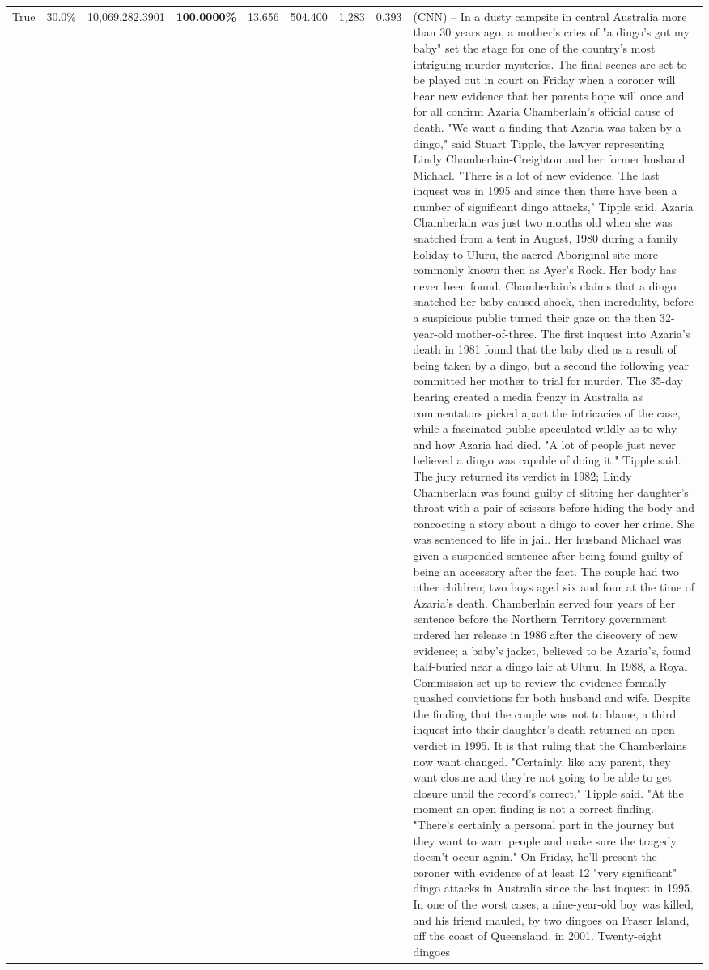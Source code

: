\begin{table}[H]
\begin{tabular}{lllrlllll}
True & 30.0\% & 10,069,282.3901 & \bfseries \color{red} 100.0000\% & 13.656 & 504.400 & 1,283 & 0.393 & (CNN) -- In a dusty campsite in central Australia more than 30 years ago, a mother's cries of "a dingo's got my baby" set the stage for one of the country's most intriguing murder mysteries. The final scenes are set to be played out in court on Friday when a coroner will hear new evidence that her parents hope will once and for all confirm Azaria Chamberlain's official cause of death. "We want a finding that Azaria was taken by a dingo," said Stuart Tipple, the lawyer representing Lindy Chamberlain-Creighton and her former husband Michael. "There is a lot of new evidence. The last inquest was in 1995 and since then there have been a number of significant dingo attacks," Tipple said. Azaria Chamberlain was just two months old when she was snatched from a tent in August, 1980 during a family holiday to Uluru, the sacred Aboriginal site more commonly known then as Ayer's Rock. Her body has never been found. Chamberlain's claims that a dingo snatched her baby caused shock, then incredulity, before a suspicious public turned their gaze on the then 32-year-old mother-of-three. The first inquest into Azaria's death in 1981 found that the baby died as a result of being taken by a dingo, but a second the following year committed her mother to trial for murder. The 35-day hearing created a media frenzy in Australia as commentators picked apart the intricacies of the case, while a fascinated public speculated wildly as to why and how Azaria had died. "A lot of people just never believed a dingo was capable of doing it," Tipple said. The jury returned its verdict in 1982; Lindy Chamberlain was found guilty of slitting her daughter's throat with a pair of scissors before hiding the body and concocting a story about a dingo to cover her crime. She was sentenced to life in jail. Her husband Michael was given a suspended sentence after being found guilty of being an accessory after the fact. The couple had two other children; two boys aged six and four at the time of Azaria's death. Chamberlain served four years of her sentence before the Northern Territory government ordered her release in 1986 after the discovery of new evidence; a baby's jacket, believed to be Azaria's, found half-buried near a dingo lair at Uluru. In 1988, a Royal Commission set up to review the evidence formally quashed convictions for both husband and wife. Despite the finding that the couple was not to blame, a third inquest into their daughter's death returned an open verdict in 1995. It is that ruling that the Chamberlains now want changed. "Certainly, like any parent, they want closure and they're not going to be able to get closure until the record's correct," Tipple said. "At the moment an open finding is not a correct finding. "There's certainly a personal part in the journey but they want to warn people and make sure the tragedy doesn't occur again." On Friday, he'll present the coroner with evidence of at least 12 "very significant" dingo attacks in Australia since the last inquest in 1995. In one of the worst cases, a nine-year-old boy was killed, and his friend mauled, by two dingoes on Fraser Island, off the coast of Queensland, in 2001. Twenty-eight dingoes 
\end{tabular}
\end{table}
